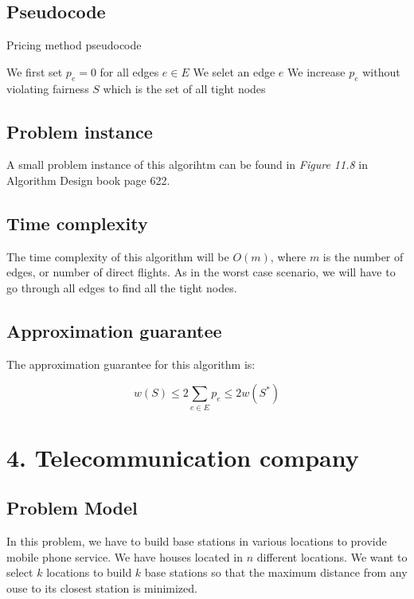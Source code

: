 \documentclass{article}
\begin{document}
\subsection*{Pseudocode}

\begin{algorithm}[H]
\caption{Pricing method pseudocode}
\begin{algorithmic}[1]
\State We first set $p_e = 0$ for all edges $e\in E$
 \State We selet an edge $e$
 \State We increase $p_e$ without violating fairness
\EndWhile
\State \Return $S$ which is the set of all tight nodes
\end{algorithmic}
\end{algorithm}

\subsection*{Problem instance}

A small problem instance of this algorihtm can be found in \textit{Figure 11.8} in Algorithm Design book page 622.

\subsection*{Time complexity}

The time complexity of this algorithm will be $O(m)$, where $m$ is the number of edges, or number of direct flights. As in the worst case scenario, we will have to go through all edges to find all the tight nodes.

\subsection*{Approximation guarantee}

The approximation guarantee for this algorithm is:

$$w(S)\leq 2\sum_{e\in E}^{} p_e\leq 2w(S^{\ast})$$

\section*{4. Telecommunication company}

\subsection*{Problem Model}

In this problem, we have to build base stations in various locations to provide mobile phone service. We have houses located in $n$ different locations. We want to select $k$ locations to build $k$ base stations so that the maximum distance from any ouse to its closest station is minimized.
\end{document}
